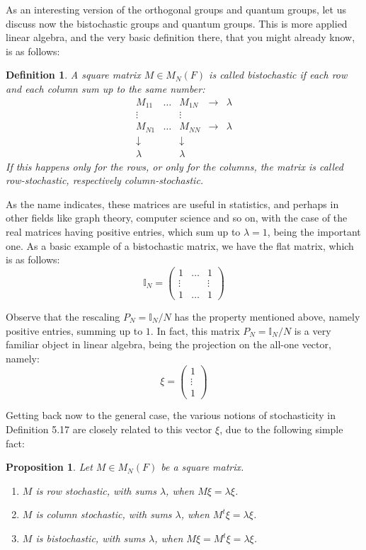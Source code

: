 \documentclass[12pt]{amsbook}
\newtheorem{definition}[theorem]{Definition}
\newtheorem{proposition}[theorem]{Proposition}
\begin{document}
As an interesting version of the orthogonal groups and quantum groups, let us discuss now the bistochastic groups and quantum groups. This is more applied linear algebra, and the very basic definition there, that you might already know, is as follows:


\begin{definition}
A square matrix $M\in M_N(F)$ is called bistochastic if each row and each column sum up to the same number:
$$\begin{matrix}
M_{11}&\ldots&M_{1N}&\to&\lambda\\
\vdots&&\vdots\\
M_{N1}&\ldots&M_{NN}&\to&\lambda\\
\downarrow&&\downarrow\\
\lambda&&\lambda
\end{matrix}$$
If this happens only for the rows, or only for the columns, the matrix is called row-stochastic, respectively column-stochastic.
\end{definition}

As the name indicates, these matrices are useful in statistics, and perhaps in other fields like graph theory, computer science and so on, with the case of the real matrices having positive entries, which sum up to $\lambda=1$, being the important one. As a basic example of a bistochastic matrix, we have the flat matrix, which is as follows:
$$\mathbb I_N=\begin{pmatrix}
1&\ldots&1\\
\vdots&&\vdots\\
1&\ldots&1
\end{pmatrix}$$

Observe that the rescaling $P_N=\mathbb I_N/N$ has the property mentioned above, namely positive entries, summing up to $1$. In fact, this matrix $P_N=\mathbb I_N/N$ is a very familiar object in linear algebra, being the projection on the all-one vector, namely:
$$\xi=\begin{pmatrix}
1\\
\vdots\\
1
\end{pmatrix}$$ 

Getting back now to the general case, the various notions of stochasticity in Definition 5.17 are closely related to this vector $\xi$, due to the following simple fact:

\begin{proposition}
Let $M\in M_N(F)$ be a square matrix.
\begin{enumerate}
\item $M$ is row stochastic, with sums $\lambda$, when $M\xi=\lambda\xi$.

\item $M$ is column stochastic, with sums $\lambda$, when $M^t\xi=\lambda\xi$.

\item $M$ is bistochastic, with sums $\lambda$, when $M\xi=M^t\xi=\lambda\xi$.
\end{enumerate}
\end{proposition}
\end{document}
